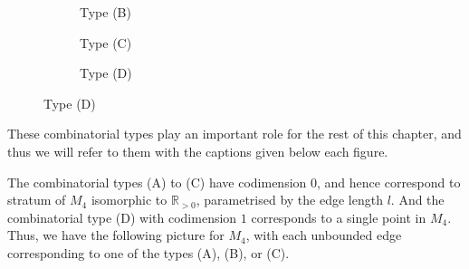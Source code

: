 \begin{example}[Looking at $M_{4}$]
\begin{figure}[h]
\begin{subfigure}[b]{0.22\textwidth}
            \caption{Type (B)}
        \end{subfigure}       
        \begin{subfigure}[b]{0.22\textwidth}
            \caption{Type (C)}
        \end{subfigure}
        \begin{subfigure}[b]{0.22\textwidth}
            \caption{Type (D)}
        \end{subfigure}
    \end{figure}
    \par These combinatorial types play an important role for the rest of this chapter, and thus we will refer to them with the captions given below each figure.
    \par The combinatorial types (A) to (C) have codimension $0$, and hence correspond to stratum of $M_{4}$ isomorphic to $\mathbb{R}_{>0}$, parametrised by the edge length $l$.
    And the combinatorial type (D) with codimension $1$ corresponds to a single point in $M_{4}$. Thus, we have the following picture for $M_{4}$, with each unbounded edge corresponding to one of the types (A), (B), or (C).

\end{example}
